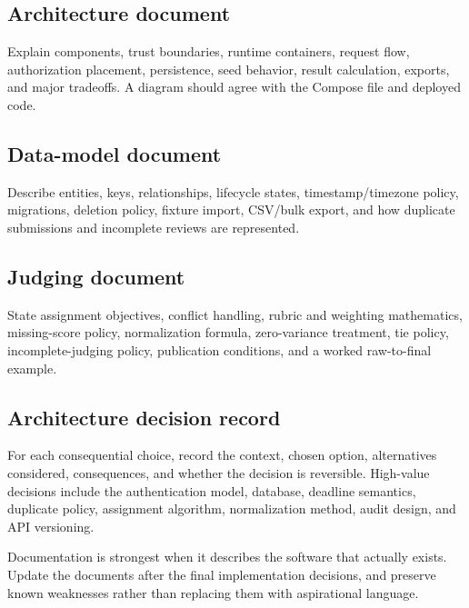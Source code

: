 \subsection{Architecture document}

Explain components, trust boundaries, runtime containers, request flow, authorization placement, persistence, seed behavior, result calculation, exports, and major tradeoffs. A diagram should agree with the Compose file and deployed code.

\subsection{Data-model document}

Describe entities, keys, relationships, lifecycle states, timestamp/timezone policy, migrations, deletion policy, fixture import, CSV/bulk export, and how duplicate submissions and incomplete reviews are represented.

\subsection{Judging document}

State assignment objectives, conflict handling, rubric and weighting mathematics, missing-score policy, normalization formula, zero-variance treatment, tie policy, incomplete-judging policy, publication conditions, and a worked raw-to-final example.

\subsection{Architecture decision record}

For each consequential choice, record the context, chosen option, alternatives considered, consequences, and whether the decision is reversible. High-value decisions include the authentication model, database, deadline semantics, duplicate policy, assignment algorithm, normalization method, audit design, and API versioning.

\begin{advicebox}
Documentation is strongest when it describes the software that actually exists. Update the documents after the final implementation decisions, and preserve known weaknesses rather than replacing them with aspirational language.
\end{advicebox}